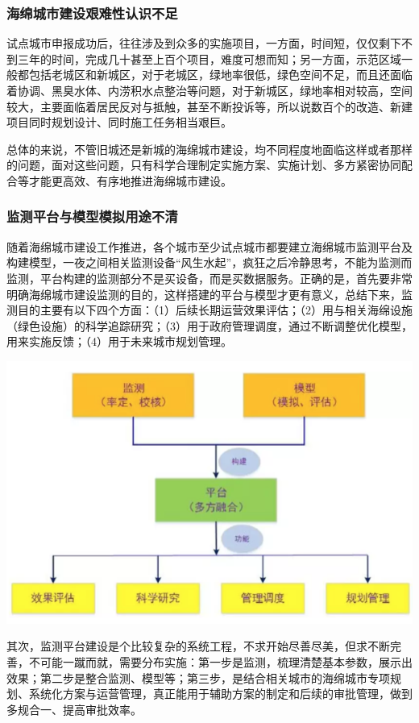 \documentclass[]{book}
\begin{document}
\subsubsection{海绵城市建设艰难性认识不足}

试点城市申报成功后，往往涉及到众多的实施项目，一方面，时间短，仅仅剩下不到三年的时间，完成几十甚至上百个项目，难度可想而知；另一方面，示范区域一般都包括老城区和新城区，对于老城区，绿地率很低，绿色空间不足，而且还面临着协调、黑臭水体、内涝积水点整治等问题，对于新城区，绿地率相对较高，空间较大，主要面临着居民反对与抵触，甚至不断投诉等，所以说数百个的改造、新建项目同时规划设计、同时施工任务相当艰巨。

总体的来说，不管旧城还是新城的海绵城市建设，均不同程度地面临这样或者那样的问题，面对这些问题，只有科学合理制定实施方案、实施计划、多方紧密协同配合等才能更高效、有序地推进海绵城市建设。

\subsubsection{监测平台与模型模拟用途不清}

随着海绵城市建设工作推进，各个城市至少试点城市都要建立海绵城市监测平台及构建模型，一夜之间相关监测设备``风生水起''，疯狂之后冷静思考，不能为监测而监测，平台构建的监测部分不是买设备，而是买数据服务。正确的是，首先要非常明确海绵城市建设监测的目的，这样搭建的平台与模型才更有意义，总结下来，监测目的主要有以下四个方面：（1）后续长期运营效果评估；（2）用与相关海绵设施（绿色设施）的科学追踪研究；（3）用于政府管理调度，通过不断调整优化模型，用来实施反馈；（4）用于未来城市规划管理。

\includegraphics[width=8.33in]{images/hm5}

其次，监测平台建设是个比较复杂的系统工程，不求开始尽善尽美，但求不断完善，不可能一蹴而就，需要分布实施：第一步是监测，梳理清楚基本参数，展示出效果；第二步是整合监测、模型等；第三步，是结合相关城市的海绵城市专项规划、系统化方案与运营管理，真正能用于辅助方案的制定和后续的审批管理，做到多规合一、提高审批效率。
\end{document}
